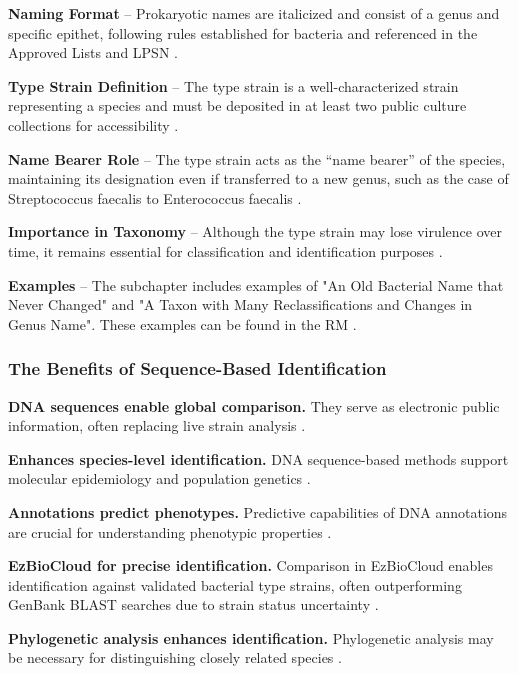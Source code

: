 \textbf{Naming Format} – Prokaryotic names are italicized and consist of a genus and specific epithet, following rules established for bacteria and referenced in the Approved Lists and LPSN \cite*{L3-SeqBasedClass}.


\textbf{Type Strain Definition} – The type strain is a well-characterized strain representing a species and must be deposited in at least two public culture collections for accessibility \cite*{L3-SeqBasedClass}.

\textbf{Name Bearer Role} – The type strain acts as the “name bearer” of the species, maintaining its designation even if transferred to a new genus, such as the case of Streptococcus faecalis to Enterococcus faecalis \cite*{L3-SeqBasedClass}.

\textbf{Importance in Taxonomy} – Although the type strain may lose virulence over time, it remains essential for classification and identification purposes \cite*{L3-SeqBasedClass}.

\textbf{Examples} – The subchapter includes examples of "An Old Bacterial Name that Never Changed" and "A Taxon with Many Reclassifications and Changes in Genus Name". These examples can be found in the RM \cite*{L3-SeqBasedClass}.
\subsubsection{The Benefits of Sequence-Based Identification}
\textbf{DNA sequences enable global comparison.} They serve as electronic public information, often replacing live strain analysis \cite*{L3-SeqBasedClass}.

\textbf{Enhances species-level identification.} DNA sequence-based methods support molecular epidemiology and population genetics \cite*{L3-SeqBasedClass}.

\textbf{Annotations predict phenotypes.} Predictive capabilities of DNA annotations are crucial for understanding phenotypic properties \cite*{L3-SeqBasedClass}.

\textbf{EzBioCloud for precise identification.} Comparison in EzBioCloud enables identification against validated bacterial type strains, often outperforming GenBank BLAST searches due to strain status uncertainty \cite*{L3-SeqBasedClass}.

\textbf{Phylogenetic analysis enhances identification.} Phylogenetic analysis may be necessary for distinguishing closely related species \cite*{L3-SeqBasedClass}.


